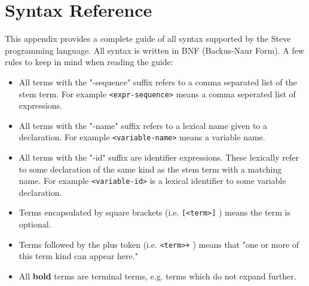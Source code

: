 \chapter{Syntax Reference} \label{ap:a}

This appendix provides a complete guide of all syntax supported by the Steve programming language. All syntax is written in BNF (Backus-Naur Form). A few rules to keep in mind when reading the guide:

\begin{itemize}
\item All terms with the "-sequence" suffix refers to a comma separated list of the stem term. For example \texttt{\textless expr-sequence\textgreater} means a comma seperated list of expressions.
\item All terms with the "-name" suffix refers to a lexical name given to a declaration. For example \texttt{\textless variable-name\textgreater} means a variable name.
\item All terms with the "-id" suffix are identifier expressions. These lexically refer to some declaration of the same kind as the stem term with a matching name. For example \texttt{\textless variable-id\textgreater} is a lexical identifier to some variable declaration.
\item Terms encapsulated by square brackets (i.e. \texttt{[\textless term\textgreater]} ) means the term is optional.
\item Terms followed by the plus token (i.e. \texttt{\textless term\textgreater +} ) means that "one or more of this term kind can appear here."
\item All \textbf{bold} terms are terminal terms, e.g. terms which do not expand further.
\end{itemize}



